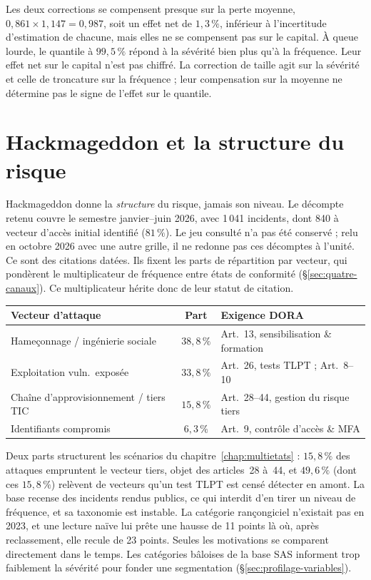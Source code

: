 Les deux corrections se compensent presque sur la perte moyenne, $0{,}861\times1{,}147=0{,}987$, soit
un effet net de $1{,}3\,\%$, inférieur à l'incertitude d'estimation de chacune, mais elles ne se compensent pas sur le capital. À queue lourde, le quantile à $99{,}5\,\%$ répond à la sévérité bien plus qu'à la fréquence. Leur effet net sur le capital n'est pas chiffré. La correction de taille agit sur la sévérité et celle de troncature sur la fréquence ; leur compensation sur la moyenne ne détermine pas le signe de l'effet sur le quantile.

\section{Hackmageddon et la structure du risque}
\label{sec:hackmageddon}

Hackmageddon donne la \emph{structure} du risque, jamais son niveau. Le décompte retenu couvre le
semestre janvier--juin 2026, avec 1\,041 incidents, dont 840 à vecteur d'accès initial identifié
($81\,\%$). Le jeu consulté n'a pas été conservé ; relu en octobre 2026 avec une autre grille, il ne redonne pas ces décomptes à l'unité. Ce sont des citations datées. Ils fixent les parts de répartition par vecteur, qui pondèrent le
multiplicateur de fréquence entre états de conformité (\S\ref{sec:quatre-canaux}). Ce
multiplicateur hérite donc de leur statut de citation.

\begin{center}
\renewcommand{\arraystretch}{1.3}
\begin{tabular}{>{\raggedright}p{5cm} c >{\raggedright\arraybackslash}p{6cm}}
\toprule
\rowcolor{lightblue}
\textbf{Vecteur d'attaque} & \textbf{Part} & \textbf{Exigence DORA} \\
\midrule
Hameçonnage / ingénierie sociale & $38{,}8\,\%$ & Art.~13, sensibilisation \& formation \\
Exploitation vuln.\ exposée & $33{,}8\,\%$ & Art.~26, tests TLPT ; Art.~8--10 \\
Chaîne d'approvisionnement / tiers TIC & $15{,}8\,\%$ & Art.~28--44, gestion du risque tiers \\
Identifiants compromis & $6{,}3\,\%$ & Art.~9, contrôle d'accès \& MFA \\
\bottomrule
\end{tabular}
\end{center}

Deux parts structurent les scénarios du chapitre~\ref{chap:multietats} : $15{,}8\,\%$ des attaques
empruntent le vecteur tiers, objet des articles~28 à~44, et $49{,}6\,\%$ (dont ces $15{,}8\,\%$) relèvent de vecteurs qu'un
test TLPT est censé détecter en amont. La base recense des incidents rendus publics, ce qui interdit
d'en tirer un niveau de fréquence, et sa taxonomie est instable. La catégorie rançongiciel n'existait
pas en 2023, et une lecture naïve lui prête une hausse de 11 points là où, après reclassement, elle recule de 23 points. Seules les motivations se comparent directement dans le temps. Les catégories bâloises de la base SAS informent trop faiblement la sévérité pour fonder une segmentation (\S\ref{sec:profilage-variables}).

